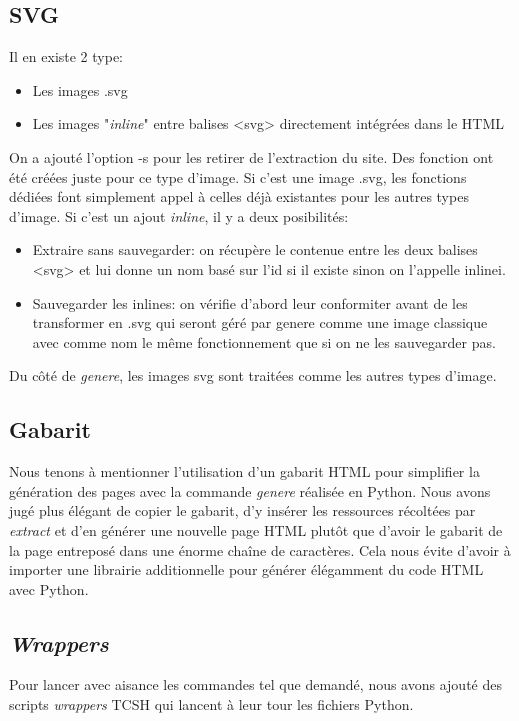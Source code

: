 \documentclass{article}
\begin{document}
\subsection{SVG}
Il en existe 2 type:
\begin{itemize}  
  \item Les images .svg
  \item Les images "\textit{inline}" entre balises <svg> directement intégrées dans le HTML
\end{itemize}
On a ajouté l’option -s pour les retirer de l’extraction du site. Des fonction ont été créées juste pour ce type d'image. 
Si c’est une image .svg, les fonctions dédiées font simplement appel à celles déjà existantes pour les autres types d’image. 
Si c’est un ajout \textit{inline}, il y a deux posibilités:
\begin{itemize}  
  \item Extraire sans sauvegarder: on récupère le contenue entre les deux balises <svg> et lui donne un nom basé sur l’id si il existe sinon on l’appelle inline{i}.
  \item Sauvegarder les inlines: on vérifie d’abord leur conformiter avant de les transformer en .svg qui seront géré par genere comme une image classique avec comme nom le même fonctionnement que si on ne les sauvegarder pas.
\end{itemize}
Du côté de \textit{genere}, les images svg sont traitées comme les autres types d'image.

\subsection{Gabarit}
Nous tenons à mentionner l'utilisation d'un gabarit HTML pour simplifier la génération des pages avec la commande \textit{genere} réalisée en Python.
Nous avons jugé plus élégant de copier le gabarit, d'y insérer les ressources récoltées par \textit{extract} et d'en générer une nouvelle page HTML plutôt que d'avoir le gabarit de la page entreposé dans une énorme chaîne de caractères.
Cela nous évite d'avoir à importer une librairie additionnelle pour générer élégamment du code HTML avec Python.

\subsection{\textit{Wrappers}}
Pour lancer avec aisance les commandes tel que demandé, nous avons ajouté des scripts \textit{wrappers} TCSH qui lancent à leur tour les fichiers Python.
\end{document}
